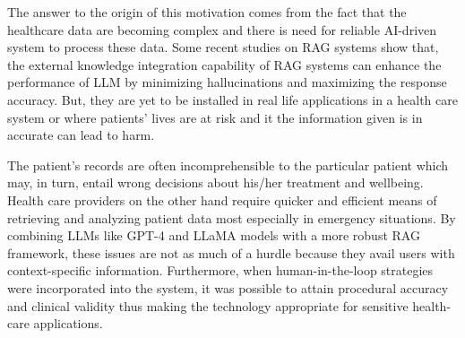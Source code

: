 The answer to the origin of this motivation comes from the fact that the healthcare data are becoming complex and there is need for reliable AI-driven system to process these data. Some recent studies on RAG systems show that, the external knowledge integration capability of RAG systems can enhance the performance of LLM by minimizing hallucinations and maximizing the response accuracy. But, they are yet to be installed in real life applications in a health care system or where patients' lives are at risk and it the information given is in accurate can lead to harm.

The patient's records are often incomprehensible to the particular patient which may, in turn, entail wrong decisions about his/her treatment and wellbeing. Health care providers on the other hand require quicker and efficient means of retrieving and analyzing patient data most especially in emergency situations. By combining LLMs like GPT-4 and LLaMA models with a more robust RAG framework, these issues are not as much of a hurdle because they avail users with context-specific information. Furthermore, when human-in-the-loop strategies were incorporated into the system, it was possible to attain procedural accuracy and clinical validity thus making the technology appropriate for sensitive health-care applications.